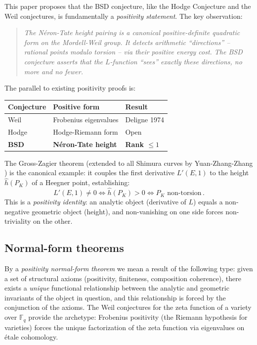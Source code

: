\documentclass[aps,prd,twocolumn,superscriptaddress,nofootinbib]{revtex4-2}
\theoremstyle{definition}
\theoremstyle{remark}
\begin{document}
This paper proposes that the BSD conjecture, like the Hodge Conjecture and the Weil conjectures, is fundamentally a \textit{positivity statement}. The key observation:

\begin{quote}
\textit{The N\'eron-Tate height pairing is a canonical positive-definite quadratic form on the Mordell-Weil group. It detects arithmetic ``directions'' -- rational points modulo torsion -- via their positive energy cost. The BSD conjecture asserts that the $L$-function ``sees'' exactly these directions, no more and no fewer.}
\end{quote}

The parallel to existing positivity proofs is:

\begin{center}
\begin{tabular}{lll}
\toprule
Conjecture & Positive form & Result \\
\midrule
Weil & Frobenius eigenvalues & Deligne 1974 \\
Hodge & Hodge-Riemann form & Open \\
\textbf{BSD} & \textbf{N\'eron-Tate height} & \textbf{Rank $\leq 1$} \\
\bottomrule
\end{tabular}
\end{center}

The Gross-Zagier theorem \cite{GrossZagier1986} (extended to all Shimura curves by Yuan-Zhang-Zhang \cite{YZZ2013}) is the canonical example: it couples the first derivative $L'(E,1)$ to the height $\hat{h}(P_K)$ of a Heegner point, establishing:
\begin{equation}
L'(E,1) \neq 0 \iff \hat{h}(P_K) > 0 \iff P_K \text{ non-torsion}\,.
\end{equation}
This is a \textit{positivity identity}: an analytic object (derivative of $L$) equals a non-negative geometric object (height), and non-vanishing on one side forces non-triviality on the other.

\subsection{Normal-form theorems}

By a \textit{positivity normal-form theorem} we mean a result of the following type: given a set of structural axioms (positivity, finiteness, composition coherence), there exists a \textit{unique} functional relationship between the analytic and geometric invariants of the object in question, and this relationship is forced by the conjunction of the axioms. The Weil conjectures for the zeta function of a variety over $\mathbb{F}_q$ provide the archetype: Frobenius positivity (the Riemann hypothesis for varieties) forces the unique factorization of the zeta function via eigenvalues on \'etale cohomology.
\end{document}
